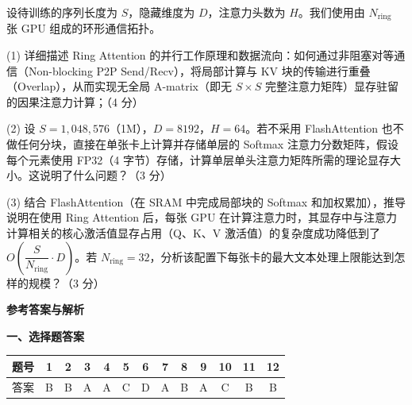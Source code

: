 \documentclass[a4paper]{ctexart}
\newcommand{\subtitlefont}{\fontsize{14pt}{20pt}\selectfont}
\newcommand{\bodyfont}{\fontsize{12pt}{16pt}\selectfont}
\newcommand{\headerfont}{\fontsize{9pt}{12pt}\selectfont}
\begin{document}
设待训练的序列长度为 $S$，隐藏维度为 $D$，注意力头数为 $H$。我们使用由 $N_{\mathrm{ring}}$ 张 GPU 组成的环形通信拓扑。

\vspace{0.3em}
(1) 详细描述 Ring Attention 的并行工作原理和数据流向：如何通过非阻塞对等通信（Non-blocking P2P Send/Recv），将局部计算与 KV 块的传输进行重叠（Overlap），从而实现无全局 A-matrix（即无 $S \times S$ 完整注意力矩阵）显存驻留的因果注意力计算；（4 分）

\vspace{0.3em}
(2) 设 $S = 1{,}048{,}576$（1M），$D = 8192$，$H = 64$。若不采用 FlashAttention 也不做任何分块，直接在单张卡上计算并存储单层的 Softmax 注意力分数矩阵，假设每个元素使用 FP32（4 字节）存储，计算单层单头注意力矩阵所需的理论显存大小。这说明了什么问题？（3 分）

\vspace{0.3em}
(3) 结合 FlashAttention（在 SRAM 中完成局部块的 Softmax 和加权累加），推导说明在使用 Ring Attention 后，每张 GPU 在计算注意力时，其显存中与注意力计算相关的核心激活值显存占用（Q、K、V 激活值）的复杂度成功降低到了 $O\!\left(\dfrac{S}{N_{\mathrm{ring}}}\cdot D\right)$。若 $N_{\mathrm{ring}} = 32$，分析该配置下每张卡的最大文本处理上限能达到怎样的规模？（3 分）

\vspace{9em}

\newpage
\fancyhead[L]{\headerfont\songti 参考答案与解析}
\fancyhead[R]{}  %

\begin{center}
\vspace*{0.2em}
{\subtitlefont\heiti\bfseries 参考答案与解析}
\end{center}
\vspace{0.4em}

{\bodyfont\heiti\bfseries 一、选择题答案}

\vspace{0.4em}
\begin{center}
\begin{tabular}{c|cccccccccccc}
\toprule
题号 & 1 & 2 & 3 & 4 & 5 & 6 & 7 & 8 & 9 & 10 & 11 & 12 \\
\midrule
答案 & B & B & A & A & C & D & A & B & A & C & B & B \\
\bottomrule
\end{tabular}
\end{center}
\end{document}
